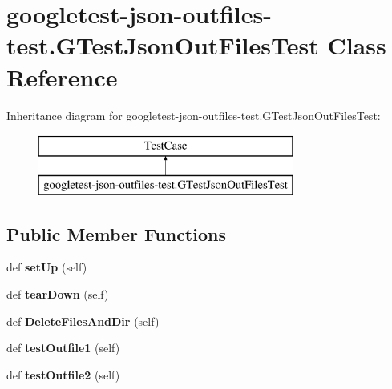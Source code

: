 \hypertarget{classgoogletest-json-outfiles-test_1_1_g_test_json_out_files_test}{}\section{googletest-\/json-\/outfiles-\/test.G\+Test\+Json\+Out\+Files\+Test Class Reference}
\label{classgoogletest-json-outfiles-test_1_1_g_test_json_out_files_test}
Inheritance diagram for googletest-\/json-\/outfiles-\/test.G\+Test\+Json\+Out\+Files\+Test\+:\begin{figure}[H]
\begin{center}
\leavevmode
\includegraphics[height=2.000000cm]{classgoogletest-json-outfiles-test_1_1_g_test_json_out_files_test}
\end{center}
\end{figure}
\subsection*{Public Member Functions}
\begin{DoxyCompactItemize}
\item 
\mbox{\label{classgoogletest-json-outfiles-test_1_1_g_test_json_out_files_test_a4d377334ff0527f037a83158faf9f92f}} 
def {\bfseries set\+Up} (self)
\item 
\mbox{\label{classgoogletest-json-outfiles-test_1_1_g_test_json_out_files_test_a26ac17ebec0c197135a217794e11ce58}} 
def {\bfseries tear\+Down} (self)
\item 
\mbox{\label{classgoogletest-json-outfiles-test_1_1_g_test_json_out_files_test_a382ecae11a217d1a972d694996485e4b}} 
def {\bfseries Delete\+Files\+And\+Dir} (self)
\item 
\mbox{\label{classgoogletest-json-outfiles-test_1_1_g_test_json_out_files_test_a3efb5b896cde155ecbc766432acd81ec}} 
def {\bfseries test\+Outfile1} (self)
\item 
\mbox{\label{classgoogletest-json-outfiles-test_1_1_g_test_json_out_files_test_a4ab6e77d7eb415cb339b42e9273730b7}} 
def {\bfseries test\+Outfile2} (self)
\end{DoxyCompactItemize}
